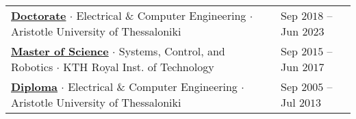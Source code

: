 \documentclass[a4paper,10pt,twoside]{article}
\begin{document}
\begin{center}
\begin{tabular}{ll}
  \href{https://ikee.lib.auth.gr/record/354644}{\textbf{Doctorate}} $\cdot$ Electrical \& Computer Engineering $\cdot$ Aristotle University of Thessaloniki & {\small \textcolor{agray}{Sep $2018$ -- Jun $2023$}} \\
  \href{http://kth.diva-portal.org/smash/record.jsf?pid=diva2\%3A1102597\&dswid=2875}{\textbf{Master of Science}} $\cdot$ Systems, Control, and Robotics $\cdot$ KTH Royal Inst. of Technology & {\small \textcolor{agray}{Sep $2015$ -- Jun $2017$}} \\
  \href{https://ikee.lib.auth.gr/record/291560}{\textbf{Diploma}} $\cdot$ Electrical \& Computer Engineering $\cdot$ Aristotle University of Thessaloniki & {\small \textcolor{agray}{Sep $2005$ -- Jul $2013$}}
\end{tabular}
\end{center}
\verticalspacebetweensections
\end{document}
